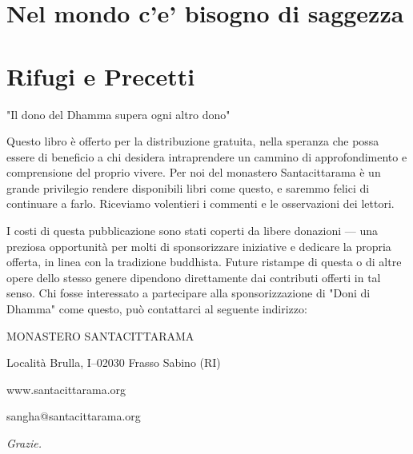 \documentclass[11pt,twoside,final]{memoir}
\begin{document}
\chapter{Nel mondo c'e' bisogno di saggezza}



\backmatter



\chapter{Rifugi e Precetti}
%


\newpage

"Il dono del Dhamma supera ogni altro dono"

Questo libro è offerto per la distribuzione gratuita, nella speranza che
possa essere di beneficio a chi desidera intraprendere un cammino di
approfondimento e comprensione del proprio vivere. Per noi del monastero
Santacittarama è un grande privilegio rendere disponibili libri come
questo, e saremmo felici di continuare a farlo. Riceviamo volentieri i
commenti e le osservazioni dei lettori.

I costi di questa pubblicazione sono stati coperti da libere donazioni —
una preziosa opportunità per molti di sponsorizzare iniziative e
dedicare la propria offerta, in linea con la tradizione buddhista.
Future ristampe di questa o di altre opere dello stesso genere dipendono
direttamente dai contributi offerti in tal senso. Chi fosse interessato
a partecipare alla sponsorizzazione di "Doni di Dhamma" come questo, può
contattarci al seguente indirizzo:

MONASTERO SANTACITTARAMA

Località Brulla, I–02030 Frasso Sabino (RI)

www.santacittarama.org

sangha@santacittarama.org

\textit{Grazie.}

\cleartorecto
\thispagestyle{plain}


\emptysheet
\end{document}
